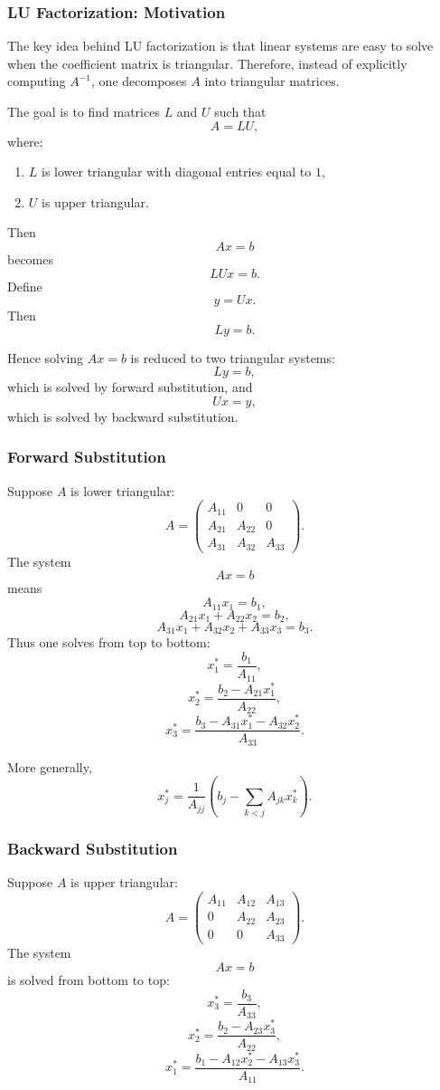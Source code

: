 \documentclass[10pt, letterpaper]{article}
\begin{document}
\subsubsection{LU Factorization: Motivation}

The key idea behind LU factorization is that linear systems are easy to solve when the coefficient matrix is triangular. Therefore, instead of explicitly computing \(A^{-1}\), one decomposes \(A\) into triangular matrices.

The goal is to find matrices \(L\) and \(U\) such that
\[
A=LU,
\]
where:
\begin{enumerate}
    \item \(L\) is lower triangular with diagonal entries equal to \(1\),
    \item \(U\) is upper triangular.
\end{enumerate}

Then
\[
Ax=b
\]
becomes
\[
LUx=b.
\]
Define
\[
y=Ux.
\]
Then
\[
Ly=b.
\]

Hence solving \(Ax=b\) is reduced to two triangular systems:
\[
Ly=b,
\]
which is solved by forward substitution, and
\[
Ux=y,
\]
which is solved by backward substitution.

\subsubsection{Forward Substitution}

Suppose \(A\) is lower triangular:
\[
A=
\begin{pmatrix}
A_{11} & 0 & 0\\
A_{21} & A_{22} & 0\\
A_{31} & A_{32} & A_{33}
\end{pmatrix}.
\]
The system
\[
Ax=b
\]
means
\[
A_{11}x_1=b_1,
\]
\[
A_{21}x_1+A_{22}x_2=b_2,
\]
\[
A_{31}x_1+A_{32}x_2+A_{33}x_3=b_3.
\]
Thus one solves from top to bottom:
\[
x_1^\ast=\frac{b_1}{A_{11}},
\]
\[
x_2^\ast
=
\frac{b_2-A_{21}x_1^\ast}{A_{22}},
\]
\[
x_3^\ast
=
\frac{b_3-A_{31}x_1^\ast-A_{32}x_2^\ast}{A_{33}}.
\]

More generally,
\[
x_j^\ast
=
\frac{1}{A_{jj}}
\left(
b_j-\sum_{k<j}A_{jk}x_k^\ast
\right).
\]

\subsubsection{Backward Substitution}

Suppose \(A\) is upper triangular:
\[
A=
\begin{pmatrix}
A_{11} & A_{12} & A_{13}\\
0 & A_{22} & A_{23}\\
0 & 0 & A_{33}
\end{pmatrix}.
\]
The system
\[
Ax=b
\]
is solved from bottom to top:
\[
x_3^\ast=\frac{b_3}{A_{33}},
\]
\[
x_2^\ast
=
\frac{b_2-A_{23}x_3^\ast}{A_{22}},
\]
\[
x_1^\ast
=
\frac{b_1-A_{12}x_2^\ast-A_{13}x_3^\ast}{A_{11}}.
\]
\end{document}
